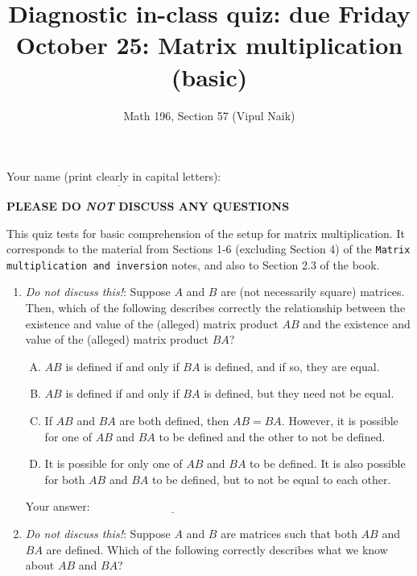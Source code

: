 \documentclass[10pt]{amsart}
\title{Diagnostic in-class quiz: due Friday October 25: Matrix multiplication (basic)}
\author{Math 196, Section 57 (Vipul Naik)}
\begin{document}
\maketitle

Your name (print clearly in capital letters): $\underline{\qquad\qquad\qquad\qquad\qquad\qquad\qquad\qquad\qquad\qquad}$

{\bf PLEASE DO {\em NOT} DISCUSS ANY QUESTIONS}

This quiz tests for basic comprehension of the setup for matrix
multiplication. It corresponds to the material from Sections 1-6
(excluding Section 4) of the {\tt Matrix multiplication and inversion}
notes, and also to Section 2.3 of the book.

\begin{enumerate}
\item {\em Do not discuss this!}: Suppose $A$ and $B$ are (not
  necessarily square) matrices. Then, which of the following describes
  correctly the relationship between the existence and value of the
  (alleged) matrix product $AB$ and the existence and value of the
  (alleged) matrix product $BA$?

  \begin{enumerate}[(A)]
  \item $AB$ is defined if and only if $BA$ is defined, and if so,
    they are equal.
  \item $AB$ is defined if and only if $BA$ is defined, but they need
    not be equal.
  \item If $AB$ and $BA$ are both defined, then $AB = BA$. However, it
    is possible for one of $AB$ and $BA$ to be defined and the other
    to not be defined.
  \item It is possible for only one of $AB$ and $BA$ to be defined. It
    is also possible for both $AB$ and $BA$ to be defined, but to not
    be equal to each other.
  \end{enumerate}

  \vspace{0.1in}
  Your answer: $\underline{\qquad\qquad\qquad\qquad\qquad\qquad\qquad}$
  \vspace{0.1in}
\item {\em Do not discuss this!}: Suppose $A$ and $B$ are matrices
  such that both $AB$ and $BA$ are defined. Which of the following
  correctly describes what we know about $AB$ and $BA$?


\end{enumerate}
\end{document}

